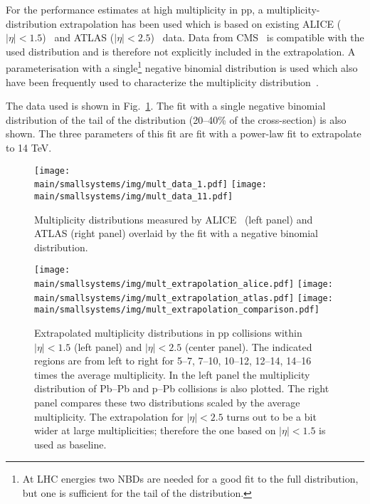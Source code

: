 \documentclass[../report.tex]{subfiles}
\providecommand{\main}{..}
\begin{document}
For the performance estimates at high multiplicity in pp, a multiplicity-distribution extrapolation has been used which is based on existing ALICE ($|\eta| < 1.5$)~\cite{Adam:2015gka} and ATLAS ($|\eta|< 2.5$)~\cite{Aad:2010ac,Aad:2016xww} data. Data from CMS~\cite{Khachatryan:2010nk} is compatible with the used distribution and is therefore not explicitly included in the extrapolation. A parameterisation with a single\footnote{At LHC energies two NBDs are needed for a good fit to the full distribution, but one is sufficient for the tail of the distribution.} negative binomial distribution is used which also have been frequently used to characterize the multiplicity distribution~\cite{GrosseOetringhaus:2009kz,ALICE:2017pcy}.

The data used is shown in Fig.~\ref{fig:smallsystems_mult_data}. The fit with a single negative binomial distribution of the tail of the distribution (20--40\% of the cross-section) is also shown. The three parameters of this fit are fit with a power-law fit to extrapolate to 14 TeV.

\begin{figure}[ht]
\centering
\texttt{[image: \\main/smallsystems/img/mult\_data\_1.pdf]}
\hfill
\texttt{[image: \\main/smallsystems/img/mult\_data\_11.pdf]}
\caption{Multiplicity distributions measured by ALICE~\cite{Adam:2015gka} (left panel) and ATLAS\cite{Aad:2010ac,Aad:2016xww} (right panel) overlaid by the fit with a negative binomial distribution.}
\label{fig:smallsystems_mult_data}
\end{figure}

\begin{figure}[ht]
\centering
\texttt{[image: \\main/smallsystems/img/mult\_extrapolation\_alice.pdf]}
\texttt{[image: \\main/smallsystems/img/mult\_extrapolation\_atlas.pdf]}
\texttt{[image: \\main/smallsystems/img/mult\_extrapolation\_comparison.pdf]}
\caption{Extrapolated multiplicity distributions in pp collisions within $|\eta| < 1.5$ (left panel) and $|\eta| < 2.5$ (center panel). The indicated regions are from left to right for 5--7, 7--10, 10--12, 12--14, 14--16 times the average multiplicity. In the left panel the multiplicity distribution of Pb--Pb and p--Pb collisions is also plotted. The right panel compares these two distributions scaled by the average multiplicity. The extrapolation for $|\eta| < 2.5$ turns out to be a bit wider at large multiplicities; therefore the one based on $|\eta| < 1.5$ is used as baseline.}
\label{fig:smallsystems_mult_extrapolation}
\end{figure}
\end{document}
